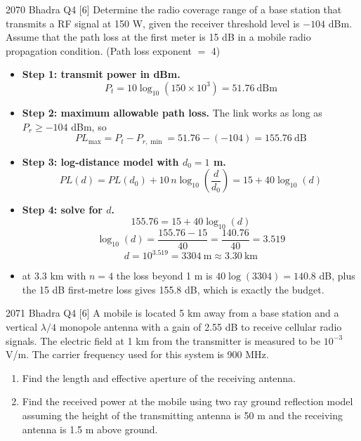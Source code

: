 \hr

{\color{sub}\footnotesize {} }

\begin{asked}{2070 Bhadra \textperiodcentered{} Q4 \textperiodcentered{} [6]}
Determine the radio coverage range of a base station that transmits a RF signal at 150 W, given
the receiver threshold level is $-104$ dBm. Assume that the path loss at the first meter is
15 dB in a mobile radio propagation condition. (Path loss exponent $=$ 4)
\end{asked}

\begin{itemize}
  \item \textbf{Step 1: transmit power in dBm.}
        \[ P_t = 10\log_{10}(150 \times 10^{3}) = 51.76\ \text{dBm} \]
  \item \textbf{Step 2: maximum allowable path loss.}
        The link works as long as $P_r \ge -104$ dBm, so
        \[ PL_{\max} = P_t - P_{r,\min} = 51.76 - (-104) = 155.76\ \text{dB} \]
  \item \textbf{Step 3: log-distance model with $d_0 = 1$ m.}
        \[ PL(d) = PL(d_0) + 10\,n\log_{10}\!\left(\frac{d}{d_0}\right)
                 = 15 + 40\log_{10}(d) \]
  \item \textbf{Step 4: solve for $d$.}
        \[ 155.76 = 15 + 40\log_{10}(d) \]
        \[ \log_{10}(d) = \frac{155.76 - 15}{40} = \frac{140.76}{40} = 3.519 \]
        \[ d = 10^{3.519} = \boxed{3304\ \text{m} \approx 3.30\ \text{km}} \]
  \item {} at 3.3 km with $n=4$ the loss beyond 1 m is
        $40\log(3304) = 140.8$ dB, plus the 15 dB first-metre loss gives 155.8 dB,
        which is exactly the budget. \checkmark
\end{itemize}

\hr

{\color{sub}\footnotesize {} }

\begin{asked}{2071 Bhadra \textperiodcentered{} Q4 \textperiodcentered{} [6]}
A mobile is located 5 km away from a base station and a vertical $\lambda/4$ monopole antenna
with a gain of 2.55 dB to receive cellular radio signals. The electric field at 1 km from the
transmitter is measured to be $10^{-3}$ V/m. The carrier frequency used for this system is
900 MHz.
\begin{enumerate}[label=\alph*), leftmargin=1.6em]
  \item Find the length and effective aperture of the receiving antenna.
  \item Find the received power at the mobile using two ray ground reflection model assuming
        the height of the transmitting antenna is 50 m and the receiving antenna is 1.5 m
        above ground.
\end{enumerate}
\end{asked}

